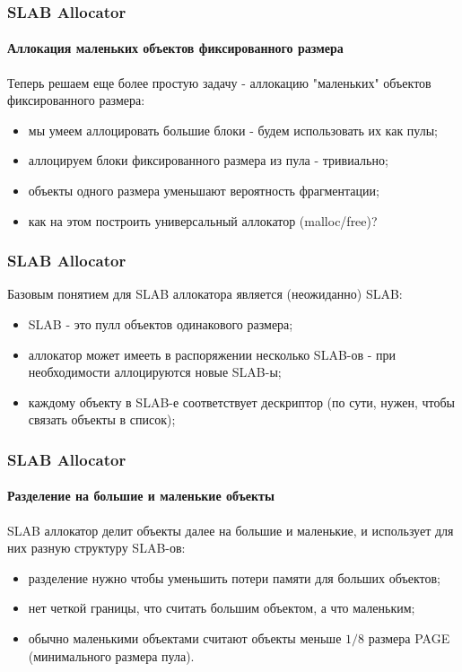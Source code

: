 \begin{frame}
\frametitle{SLAB Allocator}
\framesubtitle{Аллокация маленьких объектов фиксированного размера}

Теперь решаем еще более простую задачу - аллокацию "маленьких" объектов фиксированного размера:
\begin{itemize}
  \item мы умеем аллоцировать большие блоки - будем использовать их как пулы;
  \item аллоцируем блоки фиксированного размера из пула - тривиально;
  \item объекты одного размера уменьшают вероятность фрагментации;
  \item как на этом построить универсальный аллокатор (malloc/free)?
\end{itemize}

\end{frame}

\begin{frame}
\frametitle{SLAB Allocator}

Базовым понятием для SLAB аллокатора является (неожиданно) SLAB:
\begin{itemize}
  \item SLAB - это пулл объектов одинакового размера;
  \item аллокатор может имееть в распоряжении несколько SLAB-ов - при необходимости аллоцируются новые SLAB-ы;
  \item каждому объекту в SLAB-е соответствует дескриптор (по сути, нужен, чтобы связать объекты в список);
\end{itemize}
\end{frame}

\begin{frame}
\frametitle{SLAB Allocator}
\framesubtitle{Разделение на большие и маленькие объекты}

SLAB аллокатор делит объекты далее на большие и маленькие, и использует для них разную структуру SLAB-ов:
\begin{itemize}
  \item разделение нужно чтобы уменьшить потери памяти для больших объектов;
  \item нет четкой границы, что считать большим объектом, а что маленьким;
  \item обычно маленькими объектами считают объекты меньше $1/8$ размера PAGE (минимального размера пула).
\end{itemize}

\end{frame}

